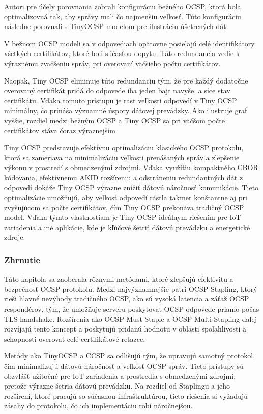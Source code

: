 \documentclass[12pt, twoside]{book}
\begin{document}
Autori pre účely porovnania zobrali konfiguráciu bežného OCSP, ktorá bola optimalizovná tak, aby správy mali čo najmenšiu veľkosť. Túto konfiguráciu následne porovnali s TinyOCSP modelom pre ilustráciu úšetrených dát.\cite{tiny}

V bežnom OCSP modeli sa v odpovediach opätovne posielajú celé identifikátory všetkých certifikátov, ktoré boli súčasťou dopytu. Táto redundancia vedie k výraznému zväčšeniu správ, pri overovaní väčšieho počtu certifikátov.\cite{tiny}

Naopak, Tiny OCSP eliminuje túto redundanciu tým, že pre každý dodatočne overovaný certifikát pridá do odpovede iba jeden bajt navyše, a síce stav certifikátu. Vďaka tomuto prístupu je rast veľkosti odpovedí v Tiny OCSP minimálny, čo prináša významné úspory dátovej prevádzky. Ako ilustruje graf vyššie, rozdiel medzi bežným OCSP a Tiny OCSP sa pri väčšom počte certifikátov stáva čoraz výraznejším. \cite{tiny}

Tiny OCSP predstavuje efektívnu optimalizáciu klasického OCSP protokolu, ktorá sa zameriava na minimalizáciu veľkosti prenášaných správ a zlepšenie výkonu v prostredí s obmedzenými zdrojmi. Vďaka využitiu kompaktného CBOR kódovania, efektívnemu AKID rozšíreniu a odstráneniu redundantných dát z odpovedí dokáže Tiny OCSP výrazne znížiť dátovú náročnosť komunikácie. Tieto optimalizácie umožňujú, aby veľkosť odpovedí rástla takmer konštantne aj pri zvyšujúcom sa počte certifikátov, čím Tiny OCSP prekonáva tradičný OCSP model. Vďaka týmto vlastnostiam je Tiny OCSP ideálnym riešením pre IoT zariadenia a iné aplikácie, kde je kľúčové šetriť dátovú prevádzku a energetické zdroje.\cite{tiny}


\subsubsection{Zhrnutie}
Táto kapitola sa zaoberala rôznymi metódami, ktoré zlepšujú efektivitu a bezpečnosť OCSP protokolu. Medzi najvýznamnejšie patrí OCSP Stapling, ktorý rieši hlavné nevýhody tradičného OCSP, ako sú vysoká latencia a záťaž OCSP respondérov, tým, že umožňuje serveru poskytovať OCSP odpovede priamo počas TLS handshake. Rozšírenia ako OCSP Must-Staple a OCSP Multi-Stapling ďalej rozvíjajú tento koncept a poskytujú pridanú hodnotu v oblasti spoľahlivosti a schopnosti overovať celé certifikátové reťazce.

Metódy ako TinyOCSP a CCSP sa odlišujú tým, že upravujú samotný protokol, čím minimalizujú dátovú náročnosť a veľkosť OCSP správ. Tieto prístupy sú obzvlášť užitočné pre IoT zariadenia a prostredia s obmedzenými zdrojmi, pretože výrazne šetria dátovú prevádzku. Na rozdiel od Staplingu a jeho rozšírení, ktoré pracujú so súčasnou infraštruktúrou, tieto riešenia si vyžadujú zásahy do protokolu, čo ich implementáciu robí náročnejšou.
\end{document}
